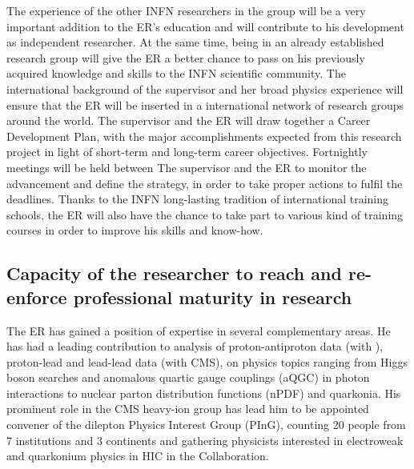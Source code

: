 \documentclass[a4paper,11pt]{article}
\newcommand{\ER}{ER\xspace}
\newcommand{\supervisor}{the supervisor\xspace}
\newcommand{\Supervisor}{The supervisor\xspace}
\begin{document}
The experience of the other INFN 
researchers in the group will be a very important addition to the \ER's
education and will contribute to his development as independent
researcher. At the same time, being in an already established research
group will give the \ER a better chance to pass on his previously
acquired knowledge and skills to the INFN scientific community. 
The international background of \supervisor and her 
broad physics experience will ensure that the 
\ER will be inserted in a international network of 
research groups around the world.  
\Supervisor and the \ER will draw together a Career Development Plan,
with the major accomplishments expected from this research project in
light of short-term and long-term career objectives. Fortnightly
meetings will be held between \Supervisor and the \ER to monitor the
advancement and define the strategy, in order to take proper actions
to fulfil the deadlines. Thanks to the INFN long-lasting tradition of
international training schools, the \ER will also have the chance to take
part to various kind of training courses in order to improve his
skills and know-how.  

%              
            

\subsection{Capacity of the researcher to reach and re-enforce professional maturity in research}
\label{sec:maturity}

The \ER has gained a position of expertise in several complementary areas. He has had a leading contribution to analysis of proton-antiproton data (with \DO), proton-lead and lead-lead data (with CMS), on physics topics ranging from Higgs boson searches and anomalous quartic gauge couplings (aQGC) in photon interactions to nuclear parton distribution functions (nPDF) and quarkonia. His prominent role in the CMS heavy-ion group has lead him to be appointed convener of the dilepton Physics Interest Group (PInG), counting 20 people from 7 institutions and 3 continents and gathering physicists interested in electroweak and quarkonium physics in HIC in the Collaboration.
\end{document}
